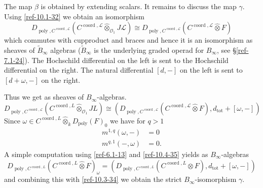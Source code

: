 \documentclass{amsart}
\numberwithin{equation}{section}
\let\cal\mathcal
\theoremstyle{definition}
\theoremstyle{remark}
\begin{document}
The map $\beta$ is obtained by extending scalars.  It remains to
discuss the map $\gamma$. Using \eqref{ref-10.1-32} we obtain an
isomorphism
\[
D_{{\operatorname{poly}},C^{{\operatorname{coord}},{{\cal L}}}}(C^{{\operatorname{coord}},{{\cal L}}}{\mathbin{\hat{\otimes}}}_{{{\cal O}}_1} J{{\cal L}})
\cong D_{{\operatorname{poly}},C^{{\operatorname{coord}},{{\cal L}}}}(C^{{\operatorname{coord}},{{\cal L}}}{\mathbin{\hat{\otimes}}} F)
\]
which commutes with cupproduct and braces and hence it is an
isomorphism as sheaves of $\widetilde{B}_\infty$ algebras ($\widetilde{B}_\infty$
is the underlying graded operad for $B_\infty$, see \S\ref{ref-7.1-24}). The
Hochschild differential on the left is sent to the Hochschild
differential on the right. The natural differential $[d,-]$ on the
left is sent to $[d+\omega,-]$ on the right.

Thus we get as sheaves of $B_\infty$-algebras.
\begin{equation}
\label{ref-10.3-34}
D_{{\operatorname{poly}},C^{{\operatorname{coord}},{{\cal L}}}}(C^{{\operatorname{coord}},L}{\mathbin{\hat{\otimes}}}_{{{\cal O}}_1} JL)
\cong (D_{{\operatorname{poly}},C^{{\operatorname{coord}},{{\cal L}}}}(C^{{\operatorname{coord}},{{\cal L}}}{\mathbin{\hat{\otimes}}} F),
d_{\text{tot}}+[\omega,-])
\end{equation}
Since $\omega\in C^{{\operatorname{coord}},L} {\mathbin{\hat{\otimes}}}_k D_{\operatorname{poly}}(F)_0$ we have for $q>1$
\begin{equation}
\label{ref-10.4-35}
\begin{split}
m^{1,q}(\omega,-)&=0\\
m^{q,1}(-,\omega)&=0.
\end{split}
\end{equation} 
A simple computation using \eqref{ref-6.1-13} and \eqref{ref-10.4-35}  yields as $B_\infty$-algebras
\[
D_{{\operatorname{poly}},C^{{\operatorname{coord}},L}}(C^{{\operatorname{coord}},L}{\mathbin{\hat{\otimes}}} F)_\omega=(D_{{\operatorname{poly}},C^{{\operatorname{coord}},L}}(C^{{\operatorname{coord}},L}{\mathbin{\hat{\otimes}}} F),d_{\text{tot}}+[\omega,-])
\]
and combining this with \eqref{ref-10.3-34} we obtain the strict $B_\infty$-isomorphism
$\gamma$. 
\end{document}
